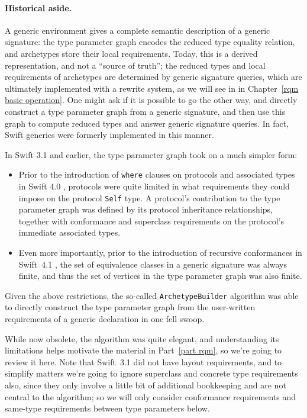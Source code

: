 \documentclass[../generics]{subfiles}
\begin{document}
\paragraph{Historical aside.} A generic environment gives a complete semantic description of a generic signature: the type parameter graph encodes the reduced type equality relation, and archetypes store their local requirements. Today, this is a derived representation, and not a ``source of truth''; the reduced types and local requirements of archetypes are determined by generic signature queries, which are ultimately implemented with a rewrite system, as we will see in in Chapter~\ref{rqm basic operation}. One might ask if it is possible to go the other way, and directly construct a type parameter graph from a generic signature, and then use this graph to compute reduced types and answer generic signature queries. In fact, Swift generics were formerly implemented in this manner.

In Swift 3.1 and earlier, the type parameter graph took on a much simpler form:
\begin{itemize}
\item Prior to the introduction of \texttt{where} clauses on protocols and associated types in Swift 4.0 \cite{se0142}, protocols were quite limited in what requirements they could impose on the protocol \texttt{Self} type. A protocol's contribution to the type parameter graph was defined by its protocol inheritance relationships, together with conformance and superclass requirements on the protocol's immediate associated types.
\item Even more importantly, prior to the introduction of recursive conformances in Swift~4.1 \cite{se0157}, the set of equivalence classes in a generic signature was always finite, and thus the set of vertices in the type parameter graph was also finite.
\end{itemize}
Given the above restrictions, the so-called \texttt{ArchetypeBuilder} algorithm was able to directly construct the type parameter graph from the user-written requirements of a generic declaration in one fell swoop.

While now obsolete, the algorithm was quite elegant, and understanding its limitations helps motivate the material in Part~\ref{part rqm}, so we're going to review it here. Note that Swift~3.1 did not have layout requirements, and to simplify matters we're going to ignore superclass and concrete type requirements also, since they only involve a little bit of additional bookkeeping and are not central to the algorithm; so we will only consider conformance requirements and same-type requirements between type parameters below.
\end{document}
